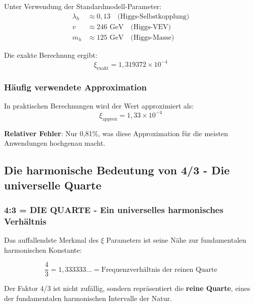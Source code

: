 \documentclass[12pt,a4paper]{article}
\newcommand{\xipar}{\ensuremath{\xi}}
\newcommand{\lambdah}{\ensuremath{\lambda_h}}
\newcommand{\mytimes}{\ensuremath{\times}}
\newcommand{\myapprox}{\ensuremath{\approx}}
\begin{document}
	Unter Verwendung der Standardmodell-Parameter:
	\begin{align}
		\lambdah &\myapprox 0,13 \quad \text{(Higgs-Selbstkopplung)} \\
		v &\myapprox 246 \text{ GeV} \quad \text{(Higgs-VEV)} \\
		m_h &\myapprox 125 \text{ GeV} \quad \text{(Higgs-Masse)}
	\end{align}
	
	Die exakte Berechnung ergibt:
	\begin{equation}
		\xipar_{\text{exakt}} = 1,319372 \mytimes 10^{-4}
		\label{eq:xi_exakt}
	\end{equation}
	
	\subsubsection{Häufig verwendete Approximation}
	\label{subsubsec:approximation}
	
	In praktischen Berechnungen wird der Wert approximiert als:
	\begin{equation}
		\xipar_{\text{approx}} = 1,33 \mytimes 10^{-4}
		\label{eq:xi_approx}
	\end{equation}
	
	\textbf{Relativer Fehler}: Nur 0,81\%, was diese Approximation für die meisten Anwendungen hochgenau macht.
	
	\subsection{Die harmonische Bedeutung von 4/3 - Die universelle Quarte}
	\label{subsec:vier_drittel_naehe}
	
	\subsubsection{4:3 = DIE QUARTE - Ein universelles harmonisches Verhältnis}
	\label{subsubsec:vier_drittel_verbindung}
	
	Das auffallendste Merkmal des $\xi$ Parameters ist seine Nähe zur fundamentalen harmonischen Konstante:
	
	\begin{equation}
		\frac{4}{3} = 1,333333\ldots = \text{Frequenzverhältnis der reinen Quarte}
		\label{eq:vier_drittel}
	\end{equation}
	
	Der Faktor 4/3 ist nicht zufällig, sondern repräsentiert die \textbf{reine Quarte}, eines der fundamentalen harmonischen Intervalle der Natur.
	
\end{document}
